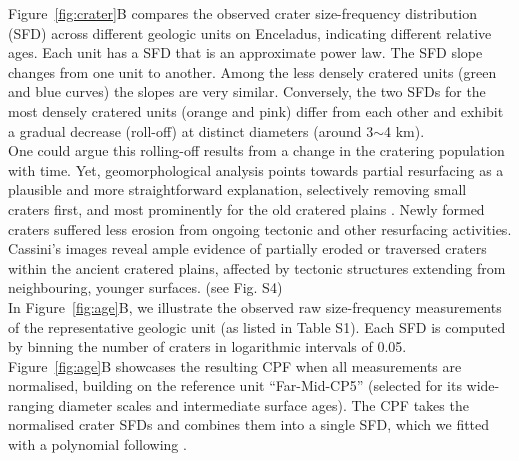 \documentclass[preprint,12pt,3p,times,authoryear]{elsarticle}
\begin{document}
Figure~\ref{fig:crater}B compares the observed crater size-frequency distribution (SFD) across different geologic units on Enceladus, indicating different relative ages. Each unit has a SFD that is an approximate power law. The SFD slope changes from one unit to another. Among the less densely cratered units (green and blue curves) the slopes are very similar. Conversely, the two SFDs for the most densely cratered units (orange and pink) differ from each other and exhibit a gradual decrease (roll-off) at distinct diameters (around 3$\sim$4 km).\\

One could argue this rolling-off results from a change in the cratering population with time. Yet, geomorphological analysis points towards partial resurfacing as a plausible and more straightforward explanation, selectively removing small craters first, and most prominently for the old cratered plains \citep{Michael2010}. Newly formed craters suffered less erosion from ongoing tectonic and other resurfacing activities. Cassini’s images reveal ample evidence of partially eroded or traversed craters within the ancient cratered plains, affected by tectonic structures extending from neighbouring, younger surfaces. (see Fig. S4)\\

In Figure~\ref{fig:age}B, we illustrate the observed raw size-frequency measurements of the representative geologic unit (as listed in Table S1). Each SFD is computed by binning the number of craters in logarithmic intervals of 0.05.%
Figure~\ref{fig:age}B showcases the resulting CPF when all measurements are normalised, building on the reference unit ``Far-Mid-CP5'' (selected for its wide-ranging diameter scales and intermediate surface ages). The CPF takes the normalised crater SFDs and combines them into a single SFD, which we fitted with a polynomial following \citet{Neukum2001}. \\

\end{document}
